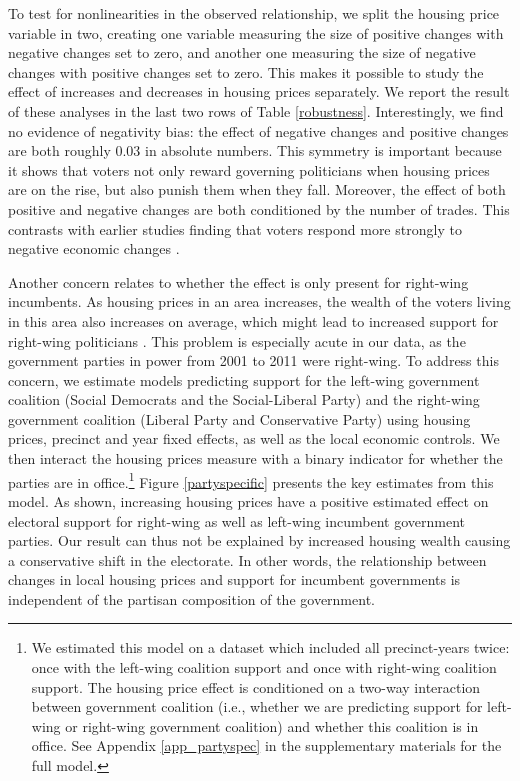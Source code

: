 \documentclass[12pt,a4paper]{article}
\begin{document}
	To test for nonlinearities in the observed relationship, we split the housing price variable in two, creating one variable measuring the size of positive changes with negative changes set to zero, and another one measuring the size of negative changes with positive changes set to zero. This makes it possible to study the effect of increases and decreases in housing prices separately. We report the result of these analyses in the last two rows of Table \ref{robustness}. Interestingly, we find no evidence of negativity bias: the effect of negative changes and positive changes are both roughly 0.03 in absolute numbers. This symmetry is important because it shows that voters not only reward governing politicians when housing prices are on the rise, but also punish them when they fall. Moreover, the effect of both positive and negative changes are both conditioned by the number of trades.  This contrasts with earlier studies finding that voters respond more strongly to negative economic changes \citep[e.g.][]{bloom1975voter,headrick1991attention,soroka2014negativity}. 
	
	Another concern relates to whether the effect is only present for right-wing incumbents. As housing prices in an area increases, the wealth of the voters living in this area also increases on average, which might lead to increased support for right-wing politicians \cite{ansell2014political}. This problem is especially acute in our data, as the government parties in power from 2001 to 2011 were right-wing. To address this concern, we estimate models predicting support for the left-wing government coalition (Social Democrats and the Social-Liberal Party) and the right-wing government coalition (Liberal Party and Conservative Party) using housing prices, precinct and year fixed effects, as well as the local economic controls. We then interact the housing prices measure with a binary indicator for whether the parties are in office.\footnote{We estimated this model on a dataset which included all precinct-years twice: once with the left-wing coalition support and once with right-wing coalition support. The housing price effect is conditioned on a two-way interaction between government coalition (i.e., whether we are predicting support for left-wing or right-wing government coalition) and whether this coalition is in office. See Appendix \ref{app_partyspec} in the supplementary materials for the full model.} Figure \ref{partyspecific} presents the key estimates from this model. As shown, increasing housing prices have a positive estimated effect on electoral support for right-wing as well as left-wing incumbent government parties. Our result can thus not be explained by increased housing wealth causing a conservative shift in the electorate. In other words, the relationship between changes in local housing prices and support for incumbent governments is independent of the partisan composition of the government.
	
\end{document}
